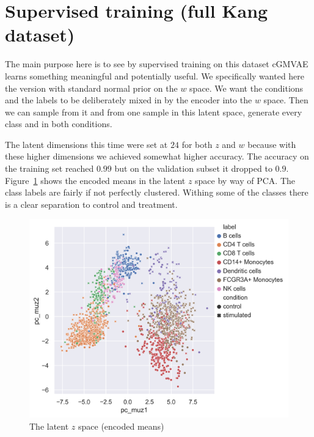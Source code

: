 \documentclass[11pt, a4paper]{report}
\theoremstyle{plain}
\theoremstyle{definition}
\theoremstyle{remark}
\begin{document}
\section{Supervised training (full Kang dataset)}

The main purpose here is to see by supervised training on
this dataset cGMVAE learns something meaningful and potentially useful.
We specifically wanted here the version with standard normal prior on the $w$
space. We want the conditions and the labels to be deliberately mixed in by the encoder
into the $w$ space. Then we can sample from it and from one sample in this
latent space, generate every class and in both conditions.

The latent dimensions this time were set at $24$ for both $z$ and $w$ because
with these higher dimensions we achieved somewhat higher accuracy.
The accuracy on the training set reached $0.99$ but on the validation subset it
dropped to $0.9$. Figure~\ref{fig:Kang_super_val_mu_z} shows the encoded means
in the latent $z$ space by way of PCA. The class labels are fairly if not
perfectly clustered. Withing some of the classes there is a clear separation to
control and treatment.

\begin{figure}[h]
\centering
\includegraphics[width=1.1\textwidth]{images/Kang_super_val_mu_z.png}
\caption{
The latent $z$ space (encoded means)
}
\label{fig:Kang_super_val_mu_z}
\end{figure}
\end{document}
